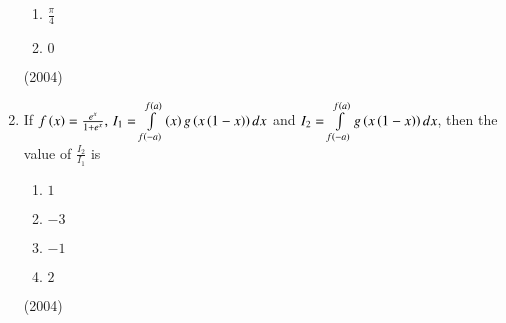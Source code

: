 \documentclass[journal]{IEEEtran}
\begin{document}
\begin{enumerate}
\begin{enumerate}
				\item $\frac{\pi}{4}$
				\item $0$
			\end{enumerate}
			\hfill (2004)
	\item
		If $f\left(x\right)= \frac{e^x}{1+e^x}, \, I_1=\int \limits_{f\left(-a\right)}^{f\left(a\right)}\left(x\right) g\left(x\left(1-x\right)\right)dx$ and $I_2 = \int \limits_{f\left(-a\right)}^{f\left(a\right)}g\left(x\left(1-x\right)\right)dx$, then the value of $\frac{I_2}{I_1}$ is 
			\begin{enumerate}
				\item $1$
				\item $-3$
				\item $-1$
				\item $2$
			\end{enumerate}
			\hfill (2004)
\end{enumerate}



  
\end{document}
